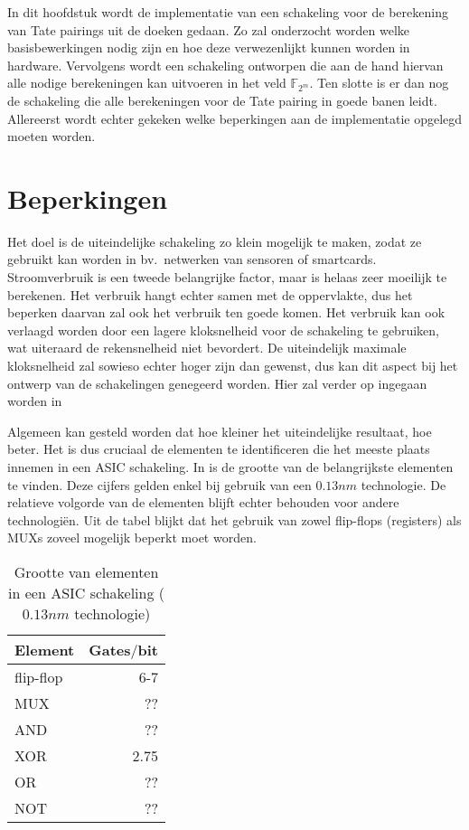 \label{hfdst-implementatie}

In dit hoofdstuk wordt de implementatie van een schakeling voor de berekening van Tate pairings uit de doeken gedaan. Zo zal onderzocht worden welke basisbewerkingen nodig zijn en hoe deze verwezenlijkt kunnen worden in hardware. Vervolgens wordt een schakeling ontworpen die aan de hand hiervan alle nodige berekeningen kan uitvoeren in het veld $\mathbb{F}_{2^m}$. Ten slotte is er dan nog de schakeling die alle berekeningen voor de Tate pairing in goede banen leidt. Allereerst wordt echter gekeken welke beperkingen aan de implementatie opgelegd moeten worden.

\section{Beperkingen}

Het doel is de uiteindelijke schakeling zo klein mogelijk te maken, zodat ze gebruikt kan worden in bv.\ netwerken van sensoren of smartcards. Stroomverbruik is een tweede belangrijke factor, maar is helaas zeer moeilijk te berekenen. Het verbruik hangt echter samen met de oppervlakte, dus het beperken daarvan zal ook het verbruik ten goede komen. Het verbruik kan ook verlaagd worden door een lagere kloksnelheid voor de schakeling te gebruiken, wat uiteraard de rekensnelheid niet bevordert. De uiteindelijk maximale kloksnelheid zal sowieso echter hoger zijn dan gewenst, dus kan dit aspect bij het ontwerp van de schakelingen genegeerd worden. Hier zal verder op ingegaan worden in 

Algemeen kan gesteld worden dat hoe kleiner het uiteindelijke resultaat, hoe beter. Het is dus cruciaal de elementen te identificeren die het meeste plaats innemen in een ASIC schakeling. In  is de grootte van de belangrijkste elementen te vinden. Deze cijfers gelden enkel bij gebruik van een $0.13 nm$ technologie. De relatieve volgorde van de elementen blijft echter behouden voor andere technologi\"en. Uit de tabel blijkt dat het gebruik van zowel flip-flops (registers) als MUXs zoveel mogelijk beperkt moet worden.

\begin{table}[h]
	\caption{Grootte van elementen in een ASIC schakeling ($0.13 nm$ technologie)}
	\label{tabel-implementatie-beperkingen-elementen-gatecount}
	\begin{tabular}{|l|r|}
		\hline
		Element		& Gates$/$bit\\
		\hline
		flip-flop	& 6-7\\
		MUX			& ??\\
		AND			& ??\\
		XOR			& 2.75\\
		OR				& ??\\
		NOT			& ??\\
		\hline		
	\end{tabular}
\end{table}

